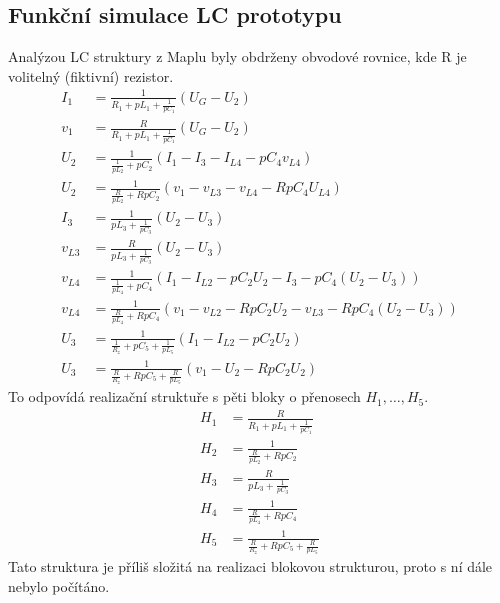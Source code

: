 \subsection{Funkční simulace LC prototypu}\label{s:KASK}
\noindent Analýzou LC struktury z Maplu byly obdrženy obvodové rovnice, kde R je volitelný (fiktivní) rezistor.
\begin{align}
I_1 &= \frac{1}{R_1 + pL_1 + \frac{1}{pC_1}}(U_G - U_2)\\
v_1 & = \frac{R}{R_1 + pL_1 + \frac{1}{pC_1}}(U_G - U_2)\\
U_2 &= \frac{1}{\frac{1}{pL_2} + pC_2}(I_1 - I_{3} - I_{L4} - pC_4 v_{L4})\\
U_2 &= \frac{1}{\frac{R}{pL_2} + RpC_2}(v_1 - v_{L3} - v_{L4} - RpC_4 U_{L4})\\
I_{3} &= \frac{1}{pL_3 + \frac{1}{pC_3}}(U_2 - U_3)\\
v_{L3} &= \frac{R}{pL_3 + \frac{1}{pC_3}}(U_2 - U_3)\\
v_{L4} &= \frac{1}{\frac{1}{pL_4}+pC_4}(I_1 - I_{L2} - pC_2U_2 - I_{3} - pC_4 (U_2 - U_3))\\
v_{L4} &= \frac{1}{\frac{R}{pL_4}+RpC_4}(v_1 - v_{L2} - RpC_2U_2 - v_{L3} - RpC_4 (U_2 - U_3))\\
U_3 &= \frac{1}{\frac{1}{R_z}+pC_5 + \frac{1}{pL_5}}(I_1 - I_{L2} - pC_2U_2)\\
U_3 &= \frac{1}{\frac{R}{R_z}+RpC_5 + \frac{R}{pL_5}}(v_1 - U_2 - RpC_2 U_2)
\end{align}
\noindent To odpovídá realizační struktuře s pěti bloky o přenosech $H_1, \ldots,H_5$.
\begin{align}
H_1 & = \frac{R}{R_1 + pL_1 + \frac{1}{pC_1}}\\
H_2 &= \frac{1}{\frac{R}{pL_2} + RpC_2}\\
H_3 &= \frac{R}{pL_3 + \frac{1}{pC_3}}\\
H_4 &= \frac{1}{\frac{R}{pL_4}+RpC_4}\\
H_5 &= \frac{1}{\frac{R}{R_z}+RpC_5 + \frac{R}{pL_5}}
\end{align}
\noindent Tato struktura je příliš složitá na realizaci blokovou strukturou, proto s ní dále nebylo počítáno. 
